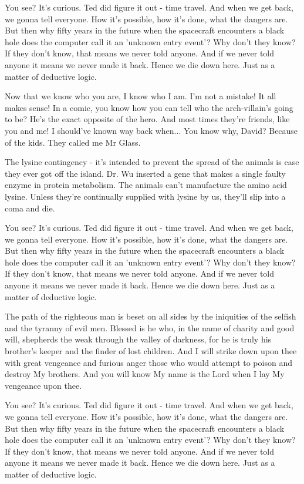 \documentclass{book}
\begin{document}
You see? It's curious. Ted did figure it out - time travel. And when we get back, we gonna tell everyone. How it's possible, how it's done, what the dangers are. But then why fifty years in the future when the spacecraft encounters a black hole does the computer call it an 'unknown entry event'? Why don't they know? If they don't know, that means we never told anyone. And if we never told anyone it means we never made it back. Hence we die down here. Just as a matter of deductive logic.

Now that we know who you are, I know who I am. I'm not a mistake! It all makes sense! In a comic, you know how you can tell who the arch-villain's going to be? He's the exact opposite of the hero. And most times they're friends, like you and me! I should've known way back when... You know why, David? Because of the kids. They called me Mr Glass.

The lysine contingency - it's intended to prevent the spread of the animals is case they ever got off the island. Dr. Wu inserted a gene that makes a single faulty enzyme in protein metabolism. The animals can't manufacture the amino acid lysine. Unless they're continually supplied with lysine by us, they'll slip into a coma and die.

You see? It's curious. Ted did figure it out - time travel. And when we get back, we gonna tell everyone. How it's possible, how it's done, what the dangers are. But then why fifty years in the future when the spacecraft encounters a black hole does the computer call it an 'unknown entry event'? Why don't they know? If they don't know, that means we never told anyone. And if we never told anyone it means we never made it back. Hence we die down here. Just as a matter of deductive logic.

The path of the righteous man is beset on all sides by the iniquities of the selfish and the tyranny of evil men. Blessed is he who, in the name of charity and good will, shepherds the weak through the valley of darkness, for he is truly his brother's keeper and the finder of lost children. And I will strike down upon thee with great vengeance and furious anger those who would attempt to poison and destroy My brothers. And you will know My name is the Lord when I lay My vengeance upon thee.

You see? It's curious. Ted did figure it out - time travel. And when we get back, we gonna tell everyone. How it's possible, how it's done, what the dangers are. But then why fifty years in the future when the spacecraft encounters a black hole does the computer call it an 'unknown entry event'? Why don't they know? If they don't know, that means we never told anyone. And if we never told anyone it means we never made it back. Hence we die down here. Just as a matter of deductive logic.
\end{document}
